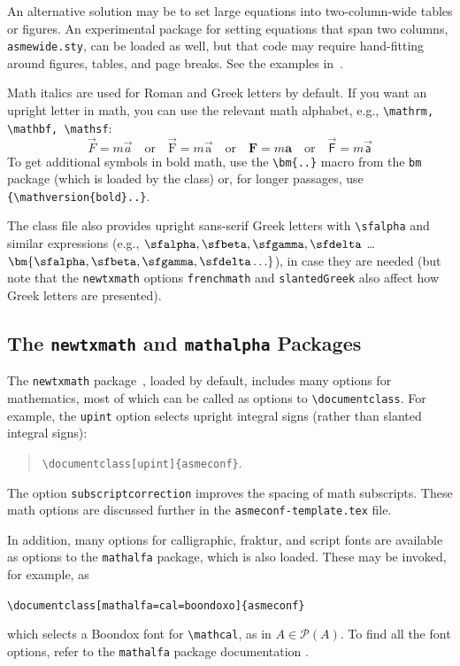 \documentclass[captionpatch,colorlinks,upint,subscriptcorrection,varvw,german]{asmeconf}
\begin{document}
An alternative solution may be to set large equations into two-column-wide tables or figures. An experimental package for setting equations that span two columns, \texttt{asmewide.sty}, can be loaded as well, but that code may require hand-fitting around figures, tables, and page breaks. See the examples in~\cite{lienhard2022}.

Math italics are used for Roman and Greek letters by default.  If you want an upright letter in math, you can use the relevant math alphabet, e.g., \verb|\mathrm, \mathbf, \mathsf|:
\begin{equation}\label{eqn:dw}
\vec{F} = m \vec{a} \quad\textrm{or}\quad \vec{\mathrm{F}} = m \vec{\mathrm{a}} \quad\textrm{or}\quad \mathbf{F} = m \mathbf{a} \quad\textrm{or}\quad \vec{\mathsf{F}} = m \vec{\mathsf{a}}
\end{equation}
To get additional symbols in bold math, use the \verb|\bm{..}| macro from the \texttt{bm} package (which is loaded by the class) or, for longer passages, use \verb|{\mathversion{bold}..|\texttt{\}}.

The class file also provides upright sans-serif Greek letters with \verb|\sfalpha| and similar expressions (e.g., $\sfalpha, \sfbeta, \sfgamma, \sfdelta$ \ldots $\bm{\sfalpha, \sfbeta, \sfgamma, \sfdelta \ldots}$), in case they are needed (but note that the \verb|newtxmath| options \verb|frenchmath| and \verb|slantedGreek| also affect how Greek letters are presented).

\subsection{The \texttt{newtxmath} and \texttt{mathalpha} Packages~\cite{sharpe1,sharpe2}} The \texttt{newtxmath} package~\cite{sharpe1}, loaded by default, includes many options for mathematics, most of which can be called as options to \verb|\documentclass|. For example, the \texttt{upint} option selects upright integral signs (rather than slanted integral signs):
\begin{quote}
\verb|\documentclass[upint]{asmeconf}|.
\end{quote}
The option \verb|subscriptcorrection| improves the spacing of math subscripts. These math options are discussed further in the \texttt{asmeconf-template.tex} file.

In addition, many options for calligraphic, fraktur, and script fonts are available as options to the \texttt{mathalfa} package, which is also loaded. These may be invoked, for example, as
\begin{center}
\verb|\documentclass[mathalfa=cal=boondoxo]{asmeconf}|
\end{center}
which selects a Boondox font for \verb|\mathcal|, as in $A \in \mathcal{P}(A)$. To find all the font options, refer to the \texttt{mathalfa} package documentation \cite{sharpe2}.
\end{document}
